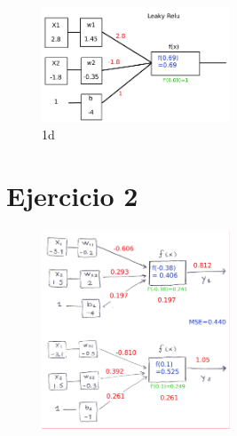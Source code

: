 \begin{enumerate}[label=(\alph*)]
                 \begin{figure}[H]
                    \begin{small}
                        \begin{center}
                            \includegraphics[width=0.5\textwidth]{Graphs/ejer1d.pdf}
                        \end{center}
                        \caption{1d}
                        \label{fig:1d}
                    \end{small}
                \end{figure}
                


\end{enumerate}

\section*{Ejercicio 2}

\begin{figure}[H]
    \begin{small}
        \begin{center}
            \includegraphics[width=0.5\textwidth]{Graphs/ejer2_grafico.pdf}
        \end{center}
        \caption{}
        \label{fig:}
    \end{small}
\end{figure}


